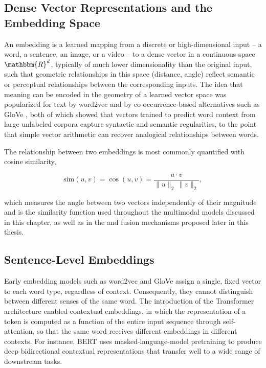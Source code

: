\subsection{Dense Vector Representations and the Embedding Space}

An embedding is a learned mapping from a discrete or high-dimensional input -- a word, a sentence, an image, or a video -- to a dense vector in a continuous space $\mathbbm{R}^d$, typically of much lower dimensionality than the original input, such that geometric relationships in this space (distance, angle) reflect semantic or perceptual relationships between the corresponding inputs. The idea that meaning can be encoded in the geometry of a learned vector space was popularized for text by word2vec \citep{mikolov2013efficient} and by co-occurrence-based alternatives such as GloVe \citep{pennington2014glove}, both of which showed that vectors trained to predict word context from large unlabeled corpora capture syntactic and semantic regularities, to the point that simple vector arithmetic can recover analogical relationships between words.

The relationship between two embeddings is most commonly quantified with cosine similarity,

\begin{equation}
\text{sim}(u, v) = \cos(u, v) = \frac{u \cdot v}{\lVert u \rVert_2 \, \lVert v \rVert_2},
\label{eq:cosine_similarity}
\end{equation}

which measures the angle between two vectors independently of their magnitude and is the similarity function used throughout the multimodal models discussed in this chapter, as well as in the and fusion mechanisms proposed later in this thesis.

\subsection{Sentence-Level Embeddings}

Early embedding models such as word2vec and GloVe assign a single, fixed vector to each word type, regardless of context. Consequently, they cannot distinguish between different senses of the same word. The introduction of the Transformer architecture \citep{vaswani2017attention} enabled contextual embeddings, in which the representation of a token is computed as a function of the entire input sequence through self-attention, so that the same word receives different embeddings in different contexts. For instance, BERT \citep{devlin2019bert} uses masked-language-model pretraining to produce deep bidirectional contextual representations that transfer well to a wide range of downstream tasks.

